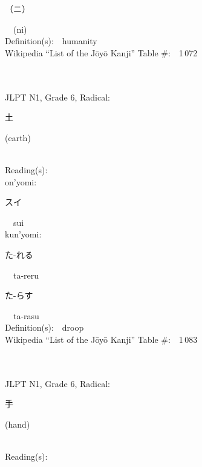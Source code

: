 \begin{multicols}{2}
{\hspace*{2em}}{\begin{CJK}{UTF8}{min} （ニ） \end{CJK}}\ \ (ni)\ \ \\
Definition(s):\ \ humanity \\
Wikipedia ``List of the J\=oy\=o Kanji'' Table \#:\ \ 1\,072 \\
\ \ \\
{\fontsize{34pt}{40pt}  }\ \ \\  %
{JLPT N1, Grade 6, Radical:\ \ {\begin{CJK}{UTF8}{min} 土 \end{CJK}} (earth) } \\
Reading(s):\ \ \\
{\hspace*{1em}}on'yomi:\ \ \\
{\hspace*{2em}}{\begin{CJK}{UTF8}{min} スイ \end{CJK}}\ \ sui\ \ \\
{\hspace*{1em}}kun'yomi:\ \ \\
{\hspace*{2em}}{\begin{CJK}{UTF8}{min} た-れる \end{CJK}}\ \ ta-reru\ \ \\
{\hspace*{2em}}{\begin{CJK}{UTF8}{min} た-らす \end{CJK}}\ \ ta-rasu\ \ \\
Definition(s):\ \ droop \\
Wikipedia ``List of the J\=oy\=o Kanji'' Table \#:\ \ 1\,083 \\
\ \ \\
{\fontsize{34pt}{40pt}  }\ \ \\  %
{JLPT N1, Grade 6, Radical:\ \ {\begin{CJK}{UTF8}{min} 手 \end{CJK}} (hand) } \\
Reading(s):\ \ \\

\end{multicols}
